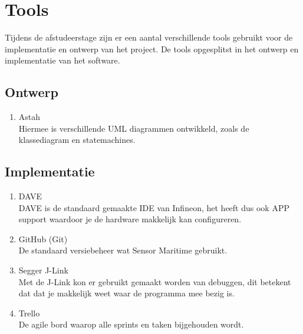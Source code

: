 \section{Tools}
Tijdens de afstudeerstage zijn er een aantal verschillende tools gebruikt voor de implementatie en ontwerp van het project. De tools opgesplitst in het ontwerp en implementatie van het software.

\subsection{Ontwerp}
\begin{enumerate}
	\item Astah \\ Hiermee is verschillende UML diagrammen ontwikkeld, zoals de klassediagram en statemachines.
\end{enumerate}
\subsection{Implementatie}
\begin{enumerate}
	\item DAVE \\ DAVE is de standaard gemaakte IDE van Infineon, het heeft dus ook APP support waardoor je de hardware makkelijk kan configureren.
	\item GitHub (Git) \\ De standaard versiebeheer wat Sensor Maritime gebruikt.
	\item Segger J-Link \\ Met de J-Link kon er gebruikt gemaakt worden van debuggen, dit betekent dat dat je makkelijk weet waar de programma mee bezig is.
	\item Trello \\ De agile bord waarop alle sprints en taken bijgehouden wordt.
\end{enumerate}

